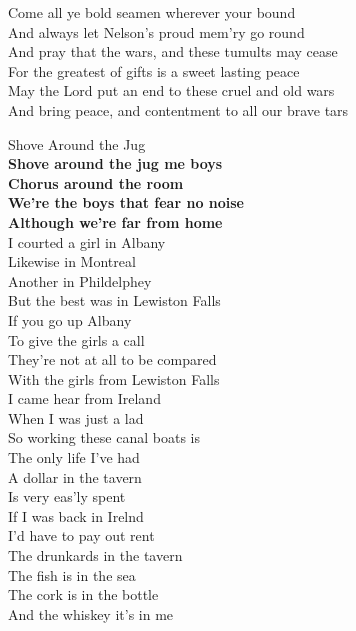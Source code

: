 \documentclass[letterpaper,9pt]{article}
\begin{document}
\huge
Come all ye bold seamen wherever your bound \\
And always let Nelson's proud mem'ry go round \\
And pray that the wars, and these tumults may cease \\
For the greatest of gifts is a sweet lasting peace \\
May the Lord put an end to these cruel and old wars \\
And bring peace, and contentment to all our brave tars \\

\newpage
{}
\Huge
Shove Around the Jug\\

\LARGE
\textbf{Shove around the jug me boys \\
Chorus around the room \\
We're the boys that fear no noise \\
Although we're far from home} \\

I courted a girl in Albany \\
Likewise in Montreal \\
Another in Phildelphey \\
But the best was in Lewiston Falls \\

If you go up Albany \\
To give the girls a call \\
They're not at all to be compared \\
With the girls from Lewiston Falls \\

I came hear from Ireland \\
When I was just a lad \\
So working these canal boats is \\
The only life I've had \\

A dollar in the tavern \\
Is very eas'ly spent \\
If I was back in Irelnd \\
I'd have to pay out rent \\

The drunkards in the tavern \\
The fish is in the sea \\
The cork is in the bottle \\
And the whiskey it's in me \\
\end{document}
